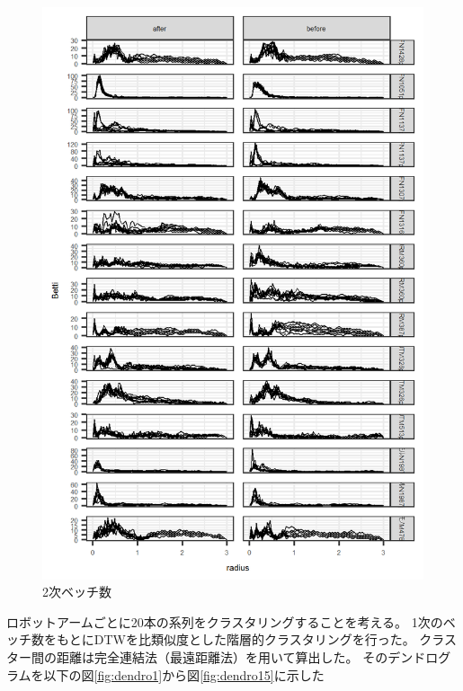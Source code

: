 \documentclass{jarticle}
\begin{document}
\begin{figure}[H]
\begin{center}
	\includegraphics[width=12cm]{fig/betti_2.png}	
	\caption{2次ベッチ数}\label{fig:ts}
\end{center}
\end{figure}

ロボットアームごとに20本の系列をクラスタリングすることを考える。
1次のベッチ数をもとにDTWを比類似度とした階層的クラスタリングを行った。
クラスター間の距離は完全連結法（最遠距離法）を用いて算出した。
そのデンドログラムを以下の図\ref{fig:dendro1}から図\ref{fig:dendro15}に示した
\end{document}
